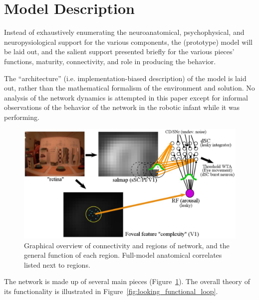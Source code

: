 \documentclass[12pt]{article}
\begin{document}
\section{Model Description}
Instead of exhaustively enumerating the neuroanatomical,
psychophysical, and neuropysiological support for the various
components, the (prototype) model will be laid out, and the salient
support presented briefly for the various pieces' functions, maturity,
connectivity, and role in producing the behavior.

The ``architecture'' (i.e. implementation-biased description) of the
model is laid out, rather than the mathematical formalism of the
environment and solution. No analysis of the network dynamics is
attempted in this paper except for informal observations of the
behavior of the network in the robotic infant while it was performing.

\begin{figure} [!t]
\centering
\includegraphics[width=15.0cm]{looking_prototype_model.jpg}
\caption{Graphical overview of connectivity and regions of network,
  and the general function of each region. Full-model anatomical
  correlates listed next to regions.}
\label{fig:looking_prototype_model}
\end{figure}

The network is made up of several main pieces
(Figure~\ref{fig:looking_prototype_model}). The overall theory of its
functionality is illustrated in
Figure~\ref{fig:looking_functional_loop}.
\end{document}
